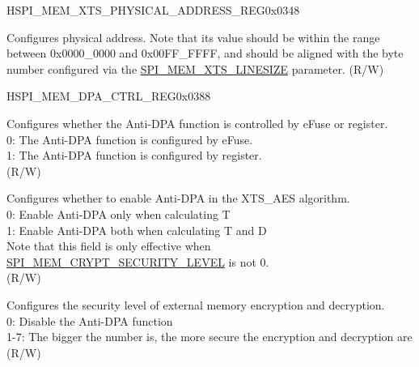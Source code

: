 \begin{register}{H}{SPI\_MEM\_XTS\_PHYSICAL\_ADDRESS\_REG}{0x0348}\label{regdesc:SPIMEMXTSPHYSICALADDRESSREG}
%
%
\regnewline%
\begin{regdesc}\begin{reglist}
\label{fielddesc:SPIMEMXTSPHYSICALADDRESS}\item [SPI\_MEM\_XTS\_PHYSICAL\_ADDRESS] Configures
physical address. Note that its value should be within the range between 0x0000\_0000 and 0x00FF\_FFFF, and should be aligned with the byte number configured via the \hyperref[fielddesc:SPIMEMXTSLINESIZE]{SPI\_MEM\_XTS\_LINESIZE} parameter. (R/W)
\end{reglist}\end{regdesc}
\end{register}


\begin{register}{H}{SPI\_MEM\_DPA\_CTRL\_REG}{0x0388}\label{regdesc:SPIMEMDPACTRLREG}
%
%
%
%
\regnewline%
\begin{regdesc}\begin{reglist}
\label{fielddesc:SPIMEMCRYPTDPASELECTREGISTER}\item [SPI\_MEM\_CRYPT\_DPA\_SELECT\_REGISTER] Configures whether the Anti-DPA function is controlled by eFuse or register. \\
0: The Anti-DPA function is configured by eFuse.\\
1: The Anti-DPA function is configured by register.\\
(R/W)
\label{fielddesc:SPIMEMCRYPTCALCDDPAEN}\item [SPI\_MEM\_CRYPT\_CALC\_D\_DPA\_EN] Configures whether to enable Anti-DPA in the XTS\_AES algorithm. \\
0: Enable Anti-DPA only when calculating T\\
1: Enable Anti-DPA both when calculating T and D\\
Note that this field is only effective when \hyperref[fielddesc:SPIMEMCRYPTSECURITYLEVEL]{SPI\_MEM\_CRYPT\_SECURITY\_LEVEL} is not 0.\\
(R/W)

\label{fielddesc:SPIMEMCRYPTSECURITYLEVEL}\item [SPI\_MEM\_CRYPT\_SECURITY\_LEVEL] Configures the security level of external memory encryption and decryption. \\
0: Disable the Anti-DPA function\\
1-7: The bigger the number is, the more secure the encryption and decryption are\\
(R/W)
\end{reglist}\end{regdesc}
\end{register}


